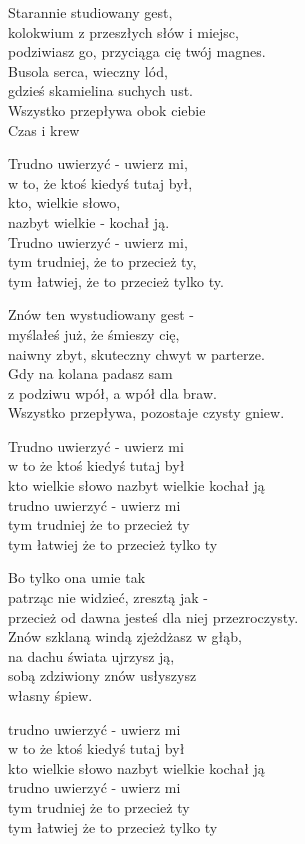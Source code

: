 \begin{text}
    Starannie studiowany gest,\\
    kolokwium z przeszłych słów i miejsc,\\
    podziwiasz go, przyciąga cię twój magnes.\\
    Busola serca, wieczny lód,\\
    gdzieś skamielina suchych ust.\\
    Wszystko przepływa obok ciebie\\
    Czas i krew

    Trudno uwierzyć - uwierz mi,\\
    w to, że ktoś kiedyś tutaj był,\\
    kto, wielkie słowo,\\
    nazbyt wielkie - kochał ją.\\
    Trudno uwierzyć - uwierz mi,\\
    tym trudniej, że to przecież ty,\\
    tym łatwiej, że to przecież tylko ty.

    Znów ten wystudiowany gest -\\
    myślałeś już, że śmieszy cię,\\
    naiwny zbyt, skuteczny chwyt w parterze.\\
    Gdy na kolana padasz sam\\
    z podziwu wpół, a wpół dla braw.\\
    Wszystko przepływa, pozostaje czysty gniew.

    Trudno uwierzyć - uwierz mi\\
    w to że ktoś kiedyś tutaj był\\
    kto wielkie słowo nazbyt wielkie kochał ją\\
    trudno uwierzyć - uwierz mi\\
    tym trudniej że to przecież ty\\
    tym łatwiej że to przecież tylko ty

    Bo tylko ona umie tak\\
    patrząc nie widzieć, zresztą jak -\\
    przecież od dawna jesteś dla niej przezroczysty.\\
    Znów szklaną windą zjeżdżasz w głąb,\\
    na dachu świata ujrzysz ją,\\
    sobą zdziwiony znów usłyszysz\\
    własny śpiew.

    trudno uwierzyć - uwierz mi\\
    w to że ktoś kiedyś tutaj był\\
    kto wielkie słowo nazbyt wielkie kochał ją\\
    trudno uwierzyć - uwierz mi\\
    tym trudniej że to przecież ty\\
    tym łatwiej że to przecież tylko ty
\end{text}
\begin{chord}

\end{chord}